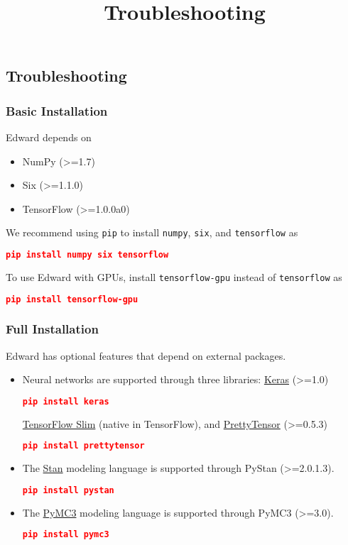 \title{Troubleshooting}

\subsection{Troubleshooting}

\subsubsection{Basic Installation}

Edward depends on

\begin{itemize}
  \item NumPy (>=1.7)
  \item Six (>=1.1.0)
  \item TensorFlow (>=1.0.0a0)
\end{itemize}

We recommend using \texttt{pip} to install \texttt{numpy},
\texttt{six}, and \texttt{tensorflow} as

\begin{lstlisting}[language=JSON]
pip install numpy six tensorflow
\end{lstlisting}

To use Edward with GPUs, install \texttt{tensorflow-gpu} instead of
\texttt{tensorflow} as

\begin{lstlisting}[language=JSON]
pip install tensorflow-gpu
\end{lstlisting}

\subsubsection{Full Installation}

Edward has optional features that depend on external packages.

\begin{itemize}
  \item Neural networks are supported through three
  libraries:
  \href{http://keras.io}{Keras} (>=1.0)
\begin{lstlisting}[language=JSON]
pip install keras
\end{lstlisting}
\href{https://github.com/tensorflow/tensorflow/tree/master/tensorflow/contrib/slim}{TensorFlow
Slim} (native in TensorFlow), and
\href{https://github.com/google/prettytensor}{PrettyTensor} (>=0.5.3)
\begin{lstlisting}[language=JSON]
pip install prettytensor
\end{lstlisting}
  \item The \href{http://mc-stan.org}{Stan} modeling language is supported
  through PyStan (>=2.0.1.3).
\begin{lstlisting}[language=JSON]
pip install pystan
\end{lstlisting}
  \item The \href{http://pymc-devs.github.io/pymc3/}{PyMC3} modeling language is supported
  through PyMC3 (>=3.0).
\begin{lstlisting}[language=JSON]
pip install pymc3
\end{lstlisting}
\end{itemize}

